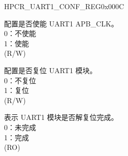 \begin{register}{H}{PCR\_UART1\_CONF\_REG}{0x000C}\label{regdesc:PCRUART1CONFREG}
%
%
%
%
\regnewline%
\begin{regdesc}\begin{reglist}
\label{fielddesc:PCRUART1CLKEN}\item [PCR\_UART1\_CLK\_EN] 配置是否使能 UART1 APB\_CLK。\\
0：不使能\\
1：使能\\(R/W)
\label{fielddesc:PCRUART1RSTEN}\item [PCR\_UART1\_RST\_EN] 配置是否复位 UART1 模块。\\
0：不复位\\
1：复位\\(R/W)
\label{fielddesc:PCRUART1READY}\item [PCR\_UART1\_READY] 表示 UART1 模块是否解复位完成。\\
0：未完成\\
1：完成\\ (RO)
\end{reglist}\end{regdesc}
\end{register}



